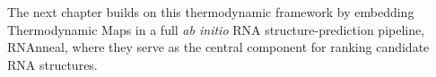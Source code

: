 The next chapter builds on this thermodynamic framework by embedding Thermodynamic Maps in a full \textit{ab initio} RNA structure-prediction pipeline, RNAnneal, where they serve as the central component for ranking candidate RNA structures.





